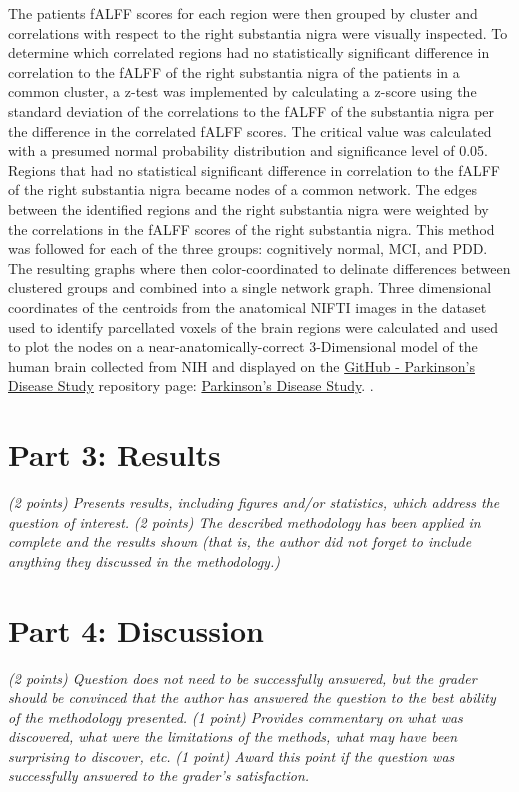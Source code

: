 \documentclass[12pt]{article}
\begin{document}
The patients fALFF scores for each region were then grouped by cluster and correlations with respect to the right substantia nigra were visually inspected. To determine which correlated regions had no statistically significant difference in correlation to the fALFF of the right substantia nigra of the patients in a common cluster, a z-test was implemented by calculating a z-score using the standard deviation of the correlations to the fALFF of the substantia nigra per the difference in the correlated fALFF scores. The critical value was calculated with a presumed normal probability distribution and significance level of 0.05. Regions that had no statistical significant difference in correlation to the fALFF of the right substantia nigra became nodes of a common network. The edges between the identified regions and the right substantia nigra were weighted by the correlations in the fALFF scores of the right substantia nigra. This method was followed for each of the three groups: cognitively normal, MCI, and PDD. The resulting graphs where then color-coordinated to delinate differences between clustered groups and combined into a single network graph. Three dimensional coordinates of the centroids from the anatomical NIFTI images in the dataset used to identify parcellated voxels of the brain regions were calculated and used to plot the nodes on a near-anatomically-correct 3-Dimensional model of the human brain collected from NIH \cite{NIH3DPX021161} and displayed on the \href{https://github.com/efwoods/Parkinson_Disease_Study}{GitHub - Parkinson's Disease Study} repository page: \href{https://efwoods.github.io/Parkinsons_Disease_Study/}{Parkinson's Disease Study}. \cite{WoodsParkinsonsStudy}.

\section{Part 3: Results}
\textit{(2 points) Presents results, including figures and/or statistics, which address the question of interest.}
\textit{(2 points) The described methodology has been applied in complete and the results shown (that is, the author did not forget to include anything they discussed in the methodology.) }


\section{Part 4: Discussion}
\textit{(2 points) Question does not need to be successfully answered, but the grader should be convinced that the author has answered the question to the best ability of the methodology presented.}
\textit{(1 point) Provides commentary on what was discovered, what were the limitations of the methods, what may have been surprising to discover, etc.}
\textit{(1 point) Award this point if the question was successfully answered to the grader's satisfaction. }
\end{document}
